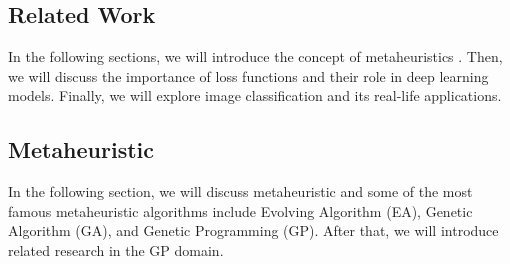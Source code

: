 \begin{ZhChapter}
    \chapter{Related Work}
    In the following sections, we will introduce the concept of metaheuristics \cite{yang2010nature,yang2011metaheuristic} . Then, we will discuss the importance of loss functions and their role in deep learning \cite{deepLearning} models. Finally, we will explore image classification \cite{rawat2017deep} and its real-life applications.

    \section{Metaheuristic}
    In the following section, we will discuss metaheuristic and some of the most famous metaheuristic algorithms include Evolving Algorithm (EA), Genetic Algorithm (GA), and Genetic Programming (GP). After that, we will introduce related research in the GP domain.

\end{ZhChapter}
